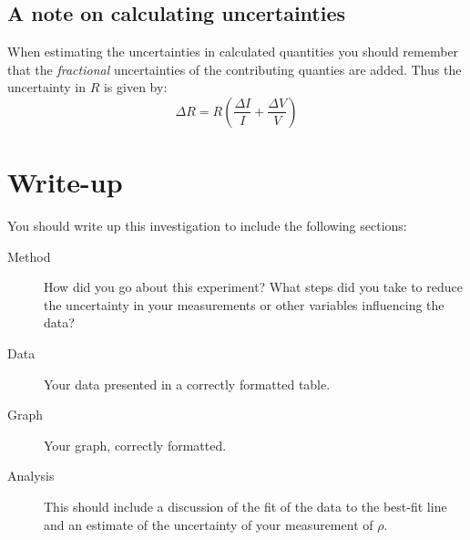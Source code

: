\documentclass[11pt]{article}
\begin{document}
\begin{adjustwidth}{0cm}{0.4\textwidth}
\subsection*{A note on calculating uncertainties}
When estimating the uncertainties in calculated quantities you should remember that the \emph{fractional} uncertainties of the contributing quanties are added.  Thus the uncertainty in $R$ is given by: 
$$ \Delta R = R \left(\frac{\Delta I}{I}+\frac{\Delta V}{V} \right)$$
\section{Write-up}
You should write up this investigation to include the following sections:
\begin{description}
    \item[Method] How did you go about this experiment?  What steps did you take to reduce the uncertainty in your measurements or other variables influencing the data?
    \item[Data] Your data presented in a correctly formatted table.
    \item[Graph] Your graph, correctly formatted.
    \item[Analysis] This should include a discussion of the fit of the data to the best-fit line and an estimate of the uncertainty of your measurement of $\rho$.
\end{description}

\end{adjustwidth}
\end{document}
